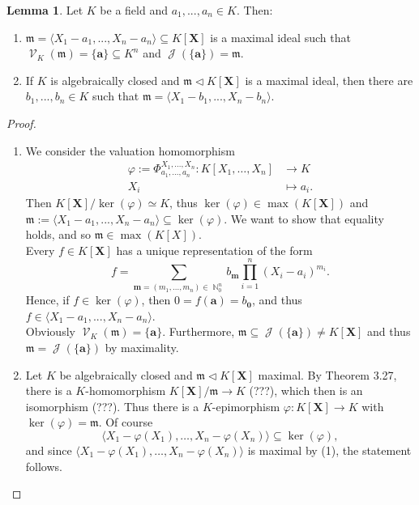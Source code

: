 \documentclass[12pt,a4paper]{report}
\theoremstyle{definition}
\newtheorem{lemma}[theorem]{Lemma}
\theoremstyle{num.custom-title}
\DeclareMathOperator{\J}{\mathcal{J}}
\DeclareMathOperator{\N}{\mathbb{N}}
\DeclareMathOperator{\V}{\mathcal{V}}
\DeclareMathOperator{\sse}{\subseteq}
\newcommand{\m}{\mathfrak{m}}
\newcommand{\X}{\mathbf{X}}
\renewcommand{\phi}{\varphi}
\begin{document}
\begin{lemma}
Let $K$ be a field and $a_1,...,a_n \in K$. Then:
\begin{enumerate}
\item $\m = \langle X_1-a_1, ..., X_n-a_n \rangle \sse K[\X]$ is a maximal ideal such that $\V_K(\m) = \{\mathbf{a}\} \sse K^n$ and $\J(\{\mathbf{a}\})=\m$.
\item If $K$ is algebraically closed and $\m \lhd K[\X]$ is a maximal ideal, then there are $b_1,...,b_n \in K$ such that $\m = \langle X_1-b_1, ..., X_n-b_n \rangle$.
\end{enumerate}
\begin{proof}\ 
\begin{enumerate}
\item We consider the valuation homomorphism
\begin{align*}
\phi:= \Phi_{a_1,\ldots,a_n}^{X_1,...,X_n} \colon K[X_1,\ldots,X_n] & \to K \\
X_i & \mapsto a_i.
\end{align*}
Then $K[\X]/\ker(\phi) \simeq K$, thus $\ker(\phi) \in \max(K[\X])$ and $\m := \langle X_1-a_1,...,X_n-a_n \rangle \sse \ker(\phi)$. We want to show that equality holds, and so $\m \in \max(K[X])$.\\
Every $f \in K[\X]$ has a unique representation of the form
\[
f = \sum_{\mathbf{m}=(m_1,\ldots,m_n) \in \N_0^n} b_\mathbf{m} \prod_{i=1}^n (X_i-a_i)^{m_i}. \tag{Taylor series}
\]
Hence, if $f \in \ker(\phi)$, then $0 = f(\mathbf{a}) = b_\mathbf{0}$, and thus $f \in \langle X_1-a_1,...,X_n-a_n \rangle$.\\ Obviously $\V_K(\m) = \{\mathbf{a}\}$. Furthermore, $\m \sse \J(\{\mathbf{a}\}) \neq K[\X]$ and thus $\m=\J(\{\mathbf{a}\})$ by maximality.
\item Let $K$ be algebraically closed and $\m \lhd K[\X]$ maximal. By Theorem 3.27, there is a $K$-homomorphism $K[\X]/\m \to K$ (???), which then is an isomorphism (???). Thus there is a $K$-epimorphism $\phi: K[\X] \to K$ with $\ker(\phi) = \m$. Of course
\[
\langle X_1 - \phi(X_1), \ldots, X_n - \phi(X_n) \rangle \sse \ker(\phi),
\]
and since $\langle X_1 - \phi(X_1), \ldots , X_n - \phi(X_n) \rangle$ is maximal by (1), the statement follows.
\end{enumerate}
\end{proof}
\end{lemma}
\end{document}
